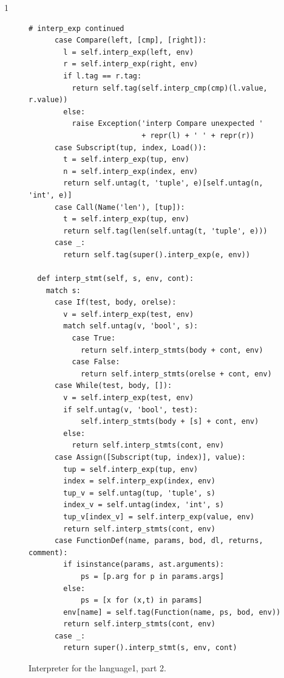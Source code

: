\documentclass[7x10]{TimesAPriori_MIT}%
\def\pythonEd{1}
\def\edition{1}
\newcommand{\pythonColor}[0]{}
\newcommand{\python}[1]{{\if\edition\pythonEd\pythonColor #1\fi}}
\numberwithin{theorem}{chapter}
\numberwithin{definition}{chapter}
\numberwithin{equation}{chapter}
\begin{document}
{\if\edition\pythonEd\pythonColor
  \begin{figure}[tbp]
\begin{tcolorbox}[colback=white]    
\begin{lstlisting}[basicstyle=\ttfamily\footnotesize]
  # interp_exp continued    
      case Compare(left, [cmp], [right]):
        l = self.interp_exp(left, env)
        r = self.interp_exp(right, env)
        if l.tag == r.tag:
          return self.tag(self.interp_cmp(cmp)(l.value, r.value))
        else:
          raise Exception('interp Compare unexpected '
                          + repr(l) + ' ' + repr(r))
      case Subscript(tup, index, Load()):
        t = self.interp_exp(tup, env)
        n = self.interp_exp(index, env)
        return self.untag(t, 'tuple', e)[self.untag(n, 'int', e)]
      case Call(Name('len'), [tup]):
        t = self.interp_exp(tup, env)
        return self.tag(len(self.untag(t, 'tuple', e)))
      case _:
        return self.tag(super().interp_exp(e, env))

  def interp_stmt(self, s, env, cont):
    match s:
      case If(test, body, orelse):
        v = self.interp_exp(test, env)
        match self.untag(v, 'bool', s):
          case True:
            return self.interp_stmts(body + cont, env)
          case False:
            return self.interp_stmts(orelse + cont, env)
      case While(test, body, []):
        v = self.interp_exp(test, env)
        if self.untag(v, 'bool', test):
            self.interp_stmts(body + [s] + cont, env)
        else:
          return self.interp_stmts(cont, env)
      case Assign([Subscript(tup, index)], value):
        tup = self.interp_exp(tup, env)
        index = self.interp_exp(index, env)
        tup_v = self.untag(tup, 'tuple', s)
        index_v = self.untag(index, 'int', s)
        tup_v[index_v] = self.interp_exp(value, env)
        return self.interp_stmts(cont, env)
      case FunctionDef(name, params, bod, dl, returns, comment):
        if isinstance(params, ast.arguments):
            ps = [p.arg for p in params.args]
        else:
            ps = [x for (x,t) in params]
        env[name] = self.tag(Function(name, ps, bod, env))
        return self.interp_stmts(cont, env)
      case _:
        return super().interp_stmt(s, env, cont)
\end{lstlisting}
\end{tcolorbox}

\caption{Interpreter for the \LangDyn{} language\python{, part 2}.}
\label{fig:interp-Ldyn-2}
\end{figure}
\fi}
\end{document}
